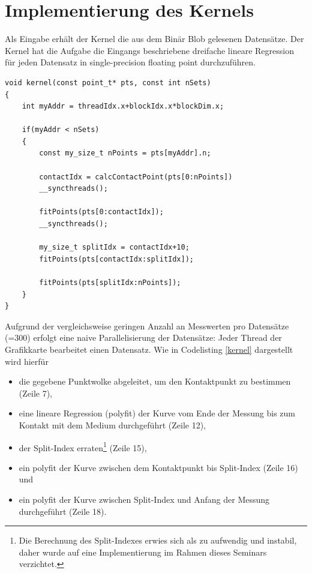 \pagebreak
\section{Implementierung des Kernels}
\label{imp_kernel}
Als Eingabe erhält der Kernel die aus dem Binär Blob gelesenen Datensätze.
Der Kernel hat die Aufgabe die Eingangs beschriebene dreifache lineare Regression für jeden Datensatz in single-precision floating point durchzuführen.

\begin{lstlisting}[caption=Implementierung des Kernel in Pseudocode,label=kernel]
void kernel(const point_t* pts, const int nSets)
{
    int myAddr = threadIdx.x+blockIdx.x*blockDim.x;

    if(myAddr < nSets)
    {
        const my_size_t nPoints = pts[myAddr].n;

        contactIdx = calcContactPoint(pts[0:nPoints])
        __syncthreads();

        fitPoints(pts[0:contactIdx]);
        __syncthreads();
                
        my_size_t splitIdx = contactIdx+10;
        fitPoints(pts[contactIdx:splitIdx]);

        fitPoints(pts[splitIdx:nPoints]);
    }
}
\end{lstlisting}


Aufgrund der vergleichsweise geringen Anzahl an Messwerten pro Datensätze (=300) erfolgt eine naive Parallelisierung der Datensätze: Jeder Thread der Grafikkarte bearbeitet einen Datensatz. Wie in Codelisting \ref{kernel} dargestellt wird hierfür

\begin{itemize}
\item die gegebene Punktwolke abgeleitet, um den Kontaktpunkt zu bestimmen (Zeile 7),
\item eine lineare Regression (polyfit) der Kurve vom Ende der Messung bis zum Kontakt mit dem Medium durchgeführt (Zeile 12),
\item der Split-Index erraten\footnote{Die Berechnung des Split-Indexes erwies sich als zu aufwendig und instabil, daher wurde auf eine Implementierung im Rahmen dieses Seminars verzichtet.} (Zeile 15),
\item ein polyfit der Kurve zwischen dem Kontaktpunkt bis Split-Index  (Zeile 16) und
\item ein polyfit der Kurve zwischen Split-Index und Anfang der Messung durchgeführt  (Zeile 18).
\end{itemize}

